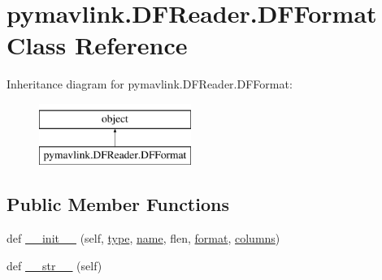 \hypertarget{classpymavlink_1_1DFReader_1_1DFFormat}{}\section{pymavlink.\+D\+F\+Reader.\+D\+F\+Format Class Reference}
\label{classpymavlink_1_1DFReader_1_1DFFormat}
Inheritance diagram for pymavlink.\+D\+F\+Reader.\+D\+F\+Format\+:\begin{figure}[H]
\begin{center}
\leavevmode
\includegraphics[height=2.000000cm]{classpymavlink_1_1DFReader_1_1DFFormat}
\end{center}
\end{figure}
\subsection*{Public Member Functions}
\begin{DoxyCompactItemize}
\item 
def \mbox{\hyperlink{classpymavlink_1_1DFReader_1_1DFFormat_a624300e91dbf0a331469d34dcc70ed00}{\+\_\+\+\_\+init\+\_\+\+\_\+}} (self, \mbox{\hyperlink{classpymavlink_1_1DFReader_1_1DFFormat_a2b5d2f5837b6a88c5155cf0e242f740f}{type}}, \mbox{\hyperlink{classpymavlink_1_1DFReader_1_1DFFormat_ad341e8512ba46835ee1e029d4141231f}{name}}, flen, \mbox{\hyperlink{classpymavlink_1_1DFReader_1_1DFFormat_a7b229df2142b24a075c4c9d4951fb5de}{format}}, \mbox{\hyperlink{classpymavlink_1_1DFReader_1_1DFFormat_a3e7e476b92d901c1ec6460257d64a121}{columns}})
\item 
def \mbox{\hyperlink{classpymavlink_1_1DFReader_1_1DFFormat_a9eb36a2ab990afd802d5088d9af10e96}{\+\_\+\+\_\+str\+\_\+\+\_\+}} (self)
\end{DoxyCompactItemize}
